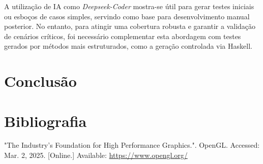 \documentclass[12pt, a4paper]{article}
\begin{document}
A utilização de IA como \textit{Deepseek-Coder} mostra-se útil para gerar testes iniciais ou esboços
de casos simples, servindo como base para desenvolvimento manual posterior. No entanto, para atingir
uma cobertura robusta e garantir a validação de cenários críticos, foi necessário complementar esta
abordagem com testes gerados por métodos mais estruturados, como a geração controlada via Haskell.

\section{Conclusão}

\begingroup
\section{Bibliografia}
\renewcommand{\section}[2]{}

\begin{thebibliography}{9}
        "The Industry's Foundation for High Performance Graphics."{}. OpenGL. Accessed:
        Mar. 2, 2025. [Online.] Available: \url{https://www.opengl.org/}
\end{thebibliography}
\endgroup
\end{document}
